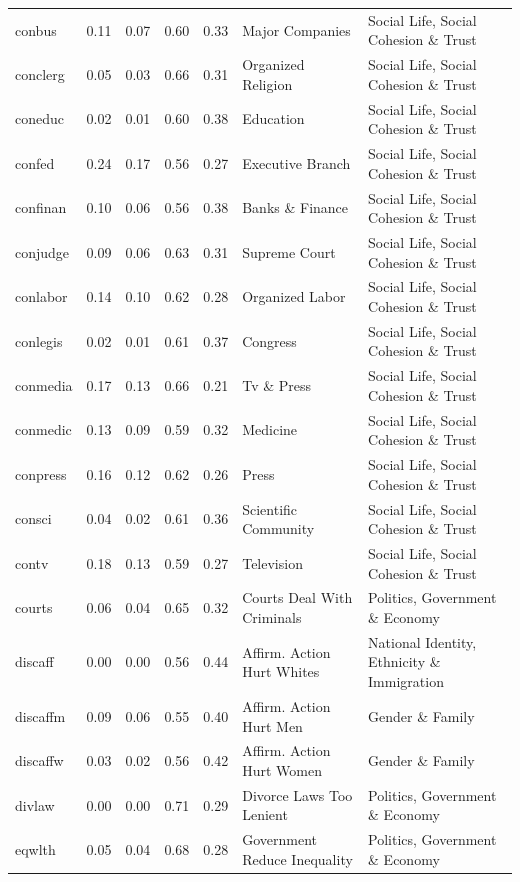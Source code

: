 \documentclass[
  12pt,
]{article}
\begin{document}
\begin{landscape}
\begin{scriptsize}
\begin{longtable}{|p{1.75in}|p{0.3in}|p{0.3in}|p{0.3in}|p{0.3in}|p{2.5in}|p{2.5in}}
conbus & 0.11 & 0.07 & 0.60 & 0.33 & Major Companies & Social Life, Social Cohesion \& Trust \\ 
conclerg & 0.05 & 0.03 & 0.66 & 0.31 & Organized Religion & Social Life, Social Cohesion \& Trust \\ 
coneduc & 0.02 & 0.01 & 0.60 & 0.38 & Education & Social Life, Social Cohesion \& Trust \\ 
confed & 0.24 & 0.17 & 0.56 & 0.27 & Executive Branch & Social Life, Social Cohesion \& Trust \\ 
confinan & 0.10 & 0.06 & 0.56 & 0.38 & Banks \& Finance & Social Life, Social Cohesion \& Trust \\ 
conjudge & 0.09 & 0.06 & 0.63 & 0.31 & Supreme Court & Social Life, Social Cohesion \& Trust \\ 
conlabor & 0.14 & 0.10 & 0.62 & 0.28 & Organized Labor & Social Life, Social Cohesion \& Trust \\ 
conlegis & 0.02 & 0.01 & 0.61 & 0.37 & Congress & Social Life, Social Cohesion \& Trust \\ 
conmedia & 0.17 & 0.13 & 0.66 & 0.21 & Tv \& Press & Social Life, Social Cohesion \& Trust \\ 
conmedic & 0.13 & 0.09 & 0.59 & 0.32 & Medicine & Social Life, Social Cohesion \& Trust \\ 
conpress & 0.16 & 0.12 & 0.62 & 0.26 & Press & Social Life, Social Cohesion \& Trust \\ 
consci & 0.04 & 0.02 & 0.61 & 0.36 & Scientific Community & Social Life, Social Cohesion \& Trust \\ 
contv & 0.18 & 0.13 & 0.59 & 0.27 & Television & Social Life, Social Cohesion \& Trust \\ 
courts & 0.06 & 0.04 & 0.65 & 0.32 & Courts Deal With Criminals & Politics, Government \& Economy \\ 
discaff & 0.00 & 0.00 & 0.56 & 0.44 & Affirm. Action Hurt Whites & National Identity, Ethnicity \& Immigration \\ 
discaffm & 0.09 & 0.06 & 0.55 & 0.40 & Affirm. Action Hurt Men & Gender \& Family \\ 
discaffw & 0.03 & 0.02 & 0.56 & 0.42 & Affirm. Action Hurt Women & Gender \& Family \\ 
divlaw & 0.00 & 0.00 & 0.71 & 0.29 & Divorce Laws Too Lenient & Politics, Government \& Economy \\ 
eqwlth & 0.05 & 0.04 & 0.68 & 0.28 & Government Reduce Inequality & Politics, Government \& Economy \\ 

\end{longtable}
\end{scriptsize}
\end{landscape}
\end{document}
